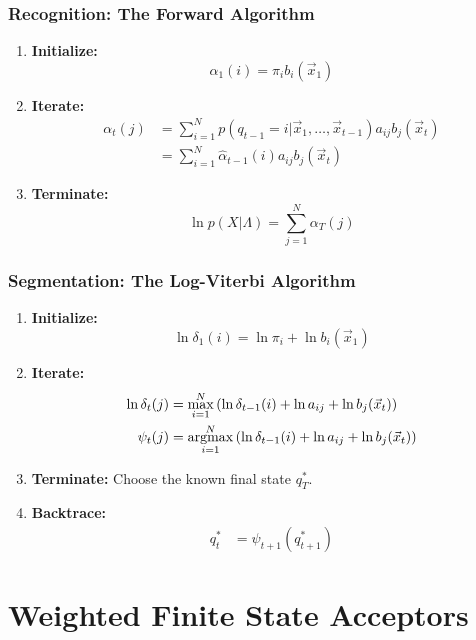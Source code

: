 \documentclass{beamer}
\newcommand{\argmax}{\operatornamewithlimits{argmax}}
\begin{document}
\begin{frame}
  \frametitle{Recognition: The Forward Algorithm}

  \begin{enumerate}
  \item {\bf Initialize:}
    \[
    \alpha_1(i) = \pi_i b_i(\vec{x}_1)
    \]
  \item {\bf Iterate:}
    \begin{align*}
      \alpha_{t}(j) &=
      \sum_{i=1}^N p(q_{t-1}=i|\vec{x}_1,\ldots,\vec{x}_{t-1})a_{ij}b_j(\vec{x}_t)\\
      &=\sum_{i=1}^N \hat\alpha_{t-1}(i) a_{ij}b_j(\vec{x}_t)
    \end{align*}
  \item {\bf Terminate:}
    \[
    \ln p(X|\Lambda) = \sum_{j=1}^N \alpha_T(j)
    \]
  \end{enumerate}
\end{frame}

\begin{frame}
  \frametitle{Segmentation: The Log-Viterbi Algorithm}

  \begin{enumerate}
  \item {\bf Initialize:}
    \[
    \ln\delta_1(i) = \ln\pi_i +\ln b_i(\vec{x}_1)
    \]
  \item {\bf Iterate:}
    \begin{align*}
      \ln\delta_{t}(j) &= \max_{i=1}^N\left(\ln\delta_{t-1}(i) +\ln a_{ij}+ \ln b_j(\vec{x}_t)\right)\\
      \psi_{t}(j) &= \argmax_{i=1}^N\left(\ln\delta_{t-1}(i) +\ln a_{ij}+ \ln b_j(\vec{x}_t)\right)
    \end{align*}
  \item {\bf Terminate:}
    Choose the known final state $q_T^*$.
  \item {\bf Backtrace:}
    \begin{align*}
      q_t^* &= \psi_{t+1}\left(q_{t+1}^*\right)
    \end{align*}
  \end{enumerate}
\end{frame}


\section[WFSA]{Weighted Finite State Acceptors}
\setcounter{subsection}{1}
\end{document}
